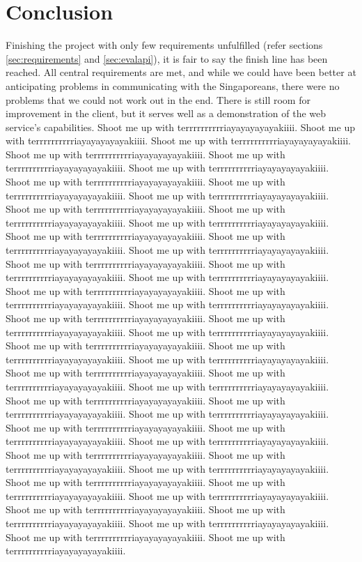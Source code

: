 \section{Conclusion}
Finishing the project with only few requirements unfulfilled (refer sections
\ref{sec:requirements} and \ref{sec:evalapi}), it is fair to say the finish
line has been reached. All central requirements are met, and while we could
have been better at anticipating problems in communicating with the
Singaporeans, there were no problems that we could not work out in the end.
There is still room for improvement in the client, but it serves well as a demonstration of the web service's capabilities.
Shoot me up with terrrrrrrrrriayayayayayakiiii.
Shoot me up with terrrrrrrrrriayayayayayakiiii.
Shoot me up with terrrrrrrrrriayayayayayakiiii.
Shoot me up with terrrrrrrrrriayayayayayakiiii.
Shoot me up with terrrrrrrrrriayayayayayakiiii.
Shoot me up with terrrrrrrrrriayayayayayakiiii.
Shoot me up with terrrrrrrrrriayayayayayakiiii.
Shoot me up with terrrrrrrrrriayayayayayakiiii.
Shoot me up with terrrrrrrrrriayayayayayakiiii.
Shoot me up with terrrrrrrrrriayayayayayakiiii.
Shoot me up with terrrrrrrrrriayayayayayakiiii.
Shoot me up with terrrrrrrrrriayayayayayakiiii.
Shoot me up with terrrrrrrrrriayayayayayakiiii.
Shoot me up with terrrrrrrrrriayayayayayakiiii.
Shoot me up with terrrrrrrrrriayayayayayakiiii.
Shoot me up with terrrrrrrrrriayayayayayakiiii.
Shoot me up with terrrrrrrrrriayayayayayakiiii.
Shoot me up with terrrrrrrrrriayayayayayakiiii.
Shoot me up with terrrrrrrrrriayayayayayakiiii.
Shoot me up with terrrrrrrrrriayayayayayakiiii.
Shoot me up with terrrrrrrrrriayayayayayakiiii.
Shoot me up with terrrrrrrrrriayayayayayakiiii.
Shoot me up with terrrrrrrrrriayayayayayakiiii.
Shoot me up with terrrrrrrrrriayayayayayakiiii.
Shoot me up with terrrrrrrrrriayayayayayakiiii.
Shoot me up with terrrrrrrrrriayayayayayakiiii.
Shoot me up with terrrrrrrrrriayayayayayakiiii.
Shoot me up with terrrrrrrrrriayayayayayakiiii.
Shoot me up with terrrrrrrrrriayayayayayakiiii.
Shoot me up with terrrrrrrrrriayayayayayakiiii.
Shoot me up with terrrrrrrrrriayayayayayakiiii.
Shoot me up with terrrrrrrrrriayayayayayakiiii.
Shoot me up with terrrrrrrrrriayayayayayakiiii.
Shoot me up with terrrrrrrrrriayayayayayakiiii.
Shoot me up with terrrrrrrrrriayayayayayakiiii.
Shoot me up with terrrrrrrrrriayayayayayakiiii.
Shoot me up with terrrrrrrrrriayayayayayakiiii.
Shoot me up with terrrrrrrrrriayayayayayakiiii.
Shoot me up with terrrrrrrrrriayayayayayakiiii.
Shoot me up with terrrrrrrrrriayayayayayakiiii.
Shoot me up with terrrrrrrrrriayayayayayakiiii.
Shoot me up with terrrrrrrrrriayayayayayakiiii.
Shoot me up with terrrrrrrrrriayayayayayakiiii.
Shoot me up with terrrrrrrrrriayayayayayakiiii.
Shoot me up with terrrrrrrrrriayayayayayakiiii.
Shoot me up with terrrrrrrrrriayayayayayakiiii.
Shoot me up with terrrrrrrrrriayayayayayakiiii.
